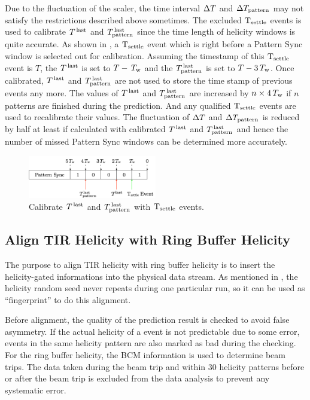 Due to the fluctuation of the scaler, the time interval $\Delta T$ and $\Delta T_{\text{pattern}}$ may not satisfy the restrictions described above sometimes. The excluded $\mathrm{T}_{\mathrm{settle}}$ events is used to calibrate $T^{\,\text{last}}$ and $T^{\,\text{last}}_{\text{pattern}}$ since the time length of helicity windows is quite accurate. As shown in , a $\mathrm{T}_{\mathrm{settle}}$ event which is right before a Pattern Sync window is selected out for calibration. Assuming the timestamp of this $\mathrm{T}_{\mathrm{settle}}$ event is $T$, the $T^{\,\text{last}}$ is set to $T-\,T_{\text{w}}$ and the $T^{\,\text{last}}_{\text{pattern}}$ is set to $T-3\,T_{\text{w}}$. Once calibrated, $T^{\,\text{last}}$ and $T^{\,\text{last}}_{\text{pattern}}$ are not used to store the time stamp of previous events any more. The values of $T^{\,\text{last}}$ and $T^{\,\text{last}}_{\text{pattern}}$ are increased by $n\times4\,T_{\text{w}}$ if $n$ patterns are finished during the prediction. And any qualified $\mathrm{T}_{\mathrm{settle}}$ events are used to recalibrate their values. The fluctuation of $\Delta T$ and $\Delta T_{\text{pattern}}$ is reduced by half at least if calculated with calibrated $T^{\,\text{last}}$ and $T^{\,\text{last}}_{\text{pattern}}$ and hence the number of missed Pattern Sync windows can be determined more accurately.

\begin{figure}[b!]
  \centering
  \includegraphics[width=0.5\textwidth]{figs/tir-helicity-tsettle-calibration.png}
  \caption{Calibrate $T^{\,\text{last}}$ and $T^{\,\text{last}}_{\text{pattern}}$ with $\mathrm{T}_{\mathrm{settle}}$ events. \label{A2S2F6}}
\end{figure}

\subsection{Align TIR Helicity with Ring Buffer Helicity}
\label{A2S2SS3}

The purpose to align TIR helicity with ring buffer helicity is to insert the helicity-gated informations into the physical data stream. As mentioned in , the helicity random seed never repeats during one particular run, so it can be used as ``fingerprint'' to do this alignment.

Before alignment, the quality of the prediction result is checked to avoid false asymmetry. If the actual helicity of a event is not predictable due to some error, events in the same helicity pattern are also marked as bad during the checking. For the ring buffer helicity, the BCM information is used to determine beam trips. The data taken during the beam trip and within 30 helicity patterns before or after the beam trip is excluded from the data analysis to prevent any systematic error.

